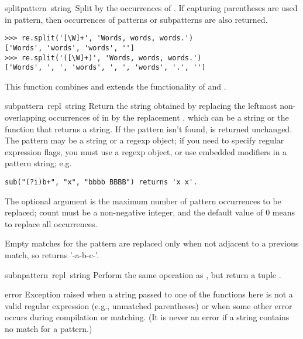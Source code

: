 \begin{funcdesc}{split}{pattern\, string\, }
  Split  by the occurrences of .  If
  capturing parentheses are used in pattern, then occurrences of
  patterns or subpatterns are also returned.
%
\bcode\begin{verbatim}
>>> re.split('[\W]+', 'Words, words, words.')
['Words', 'words', 'words', '']
>>> re.split('([\W]+)', 'Words, words, words.')
['Words', ', ', 'words', ', ', 'words', '.', '']
\end{verbatim}\ecode
%
  This function combines and extends the functionality of
   and .
\end{funcdesc}

\begin{funcdesc}{sub}{pattern\, repl\, string}
Return the string obtained by replacing the leftmost non-overlapping
occurrences of  in  by the replacement
, which can be a string or the function that returns a string.  If the pattern isn't found,  is returned unchanged. The
pattern may be a string or a regexp object; if you need to specify
regular expression flags, you must use a regexp object, or use
embedded modifiers in a pattern string; e.g.
%
\bcode\begin{verbatim}
sub("(?i)b+", "x", "bbbb BBBB") returns 'x x'.
\end{verbatim}\ecode
%
The optional argument  is the maximum number of pattern
occurrences to be replaced; count must be a non-negative integer, and
the default value of 0 means to replace all occurrences.

Empty matches for the pattern are replaced only when not adjacent to a
previous match, so  returns '-a-b-c-'.
\end{funcdesc}

\begin{funcdesc}{subn}{pattern\, repl\, string}
Perform the same operation as , but return a tuple
.
\end{funcdesc}

\begin{excdesc}{error}
  Exception raised when a string passed to one of the functions here
  is not a valid regular expression (e.g., unmatched parentheses) or
  when some other error occurs during compilation or matching.  (It is
  never an error if a string contains no match for a pattern.)
\end{excdesc}

